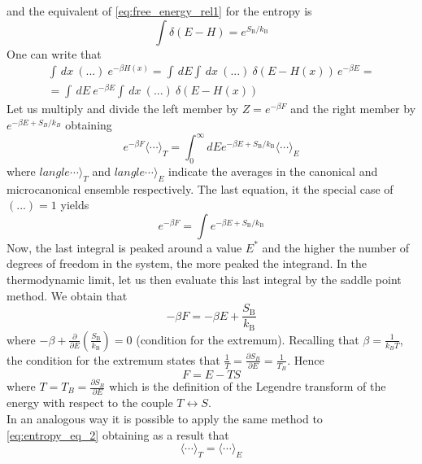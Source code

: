 and the equivalent of \ref{eq:free_energy_rel1} for the entropy is
\begin{equation*}
    \int \delta(E-H) = e^{S_{\mathrm{B}} / k_{\mathrm{B}}}
\end{equation*}
One can write that
\begin{gather*}
    \int \, dx \ (...) \ e^{-\beta H(x)} = \int \, dE \int \, dx \ (...) \ \delta(E-H(x)) \, e^{-\beta E} =  \\
    = \int \, dE \ e^{-\beta E} \int \, dx \ (...) \ \delta(E-H(x))
\end{gather*}
Let us multiply and divide the left member by $Z = e^{-\beta F}$ and the right member by $e^{-\beta E + S_B/k_B}$ obtaining
\begin{equation}
    e^{-\beta F}\langle\cdots\rangle_{T}=\int_{0}^{\infty} d E e^{-\beta E+S_{\mathrm{B}} / k_{\mathrm{B}}}\langle\cdots\rangle_{E}
    \label{eq:entropy_eq_2}
\end{equation}
where $langle\cdots\rangle_{T}$ and $langle\cdots\rangle_{E}$ indicate the averages in the canonical and microcanonical ensemble respectively. The last equation, it the special case of $(...) = 1$ yields
\begin{equation*}
    e^{-\beta F} = \int e^{-\beta E+S_{\mathrm{B}} / k_{\mathrm{B}}}
\end{equation*}
Now, the last integral is peaked around a value $E^*$ and the higher the number of degrees of freedom in the system, the more peaked the integrand. In the
thermodynamic limit, let us then evaluate this last integral by the saddle point method. We obtain that 
\begin{equation*}
    -\beta F=-\beta E+\frac{S_{\mathrm{B}}}{k_{\mathrm{B}}}
\end{equation*}
where $-\beta+\frac{\partial}{\partial E}\left(\frac{S_{\mathrm{B}}}{k_{\mathrm{B}}}\right)=0$ (condition for the extremum). Recalling that $\beta=\frac{1}{k_BT}$, the condition for the extremum states that 
$\frac{1}{T} = \frac{\partial S_B}{\partial E} = \frac{1}{T_B}$. Hence
\begin{equation}
    F = E - TS
    \label{eq:free_energy_def}
\end{equation}
where $T = T_B = \frac{\partial S_B}{\partial E}$ which is the definition of the Legendre transform of the energy with respect to the couple $T \leftrightarrow S$. \\
In an analogous way it is possible to apply the same method to \ref{eq:entropy_eq_2} obtaining as a result that 
\begin{equation}
    \langle\cdots\rangle_{T} = \langle\cdots\rangle_{E}
    \label{eq:equivalence_of_averages}
\end{equation}
